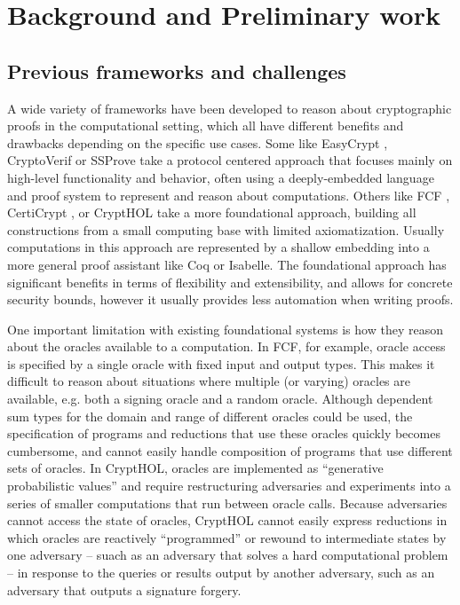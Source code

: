\section{Background and Preliminary work}

\subsection{Previous frameworks and challenges}
A wide variety of frameworks have been developed to reason about cryptographic proofs in the computational setting, which all have different benefits and drawbacks depending on the specific use cases.
Some like EasyCrypt \cite{canetti2019easyuc}, CryptoVerif \cite{blanchet2007cryptoverif} or SSProve \cite{abate2021ssprove} take a protocol centered approach that focuses mainly on high-level functionality and behavior, often using a deeply-embedded language and proof system to represent and reason about computations.
Others like FCF \cite{FCF,petcher2015foundational}, CertiCrypt \cite{zanella2010formal}, or CryptHOL \cite{basin2020crypthol} take a more foundational approach, building all constructions from a small computing base with limited axiomatization.
Usually computations in this approach are represented by a shallow embedding into a more general proof assistant like Coq or Isabelle.
The foundational approach has significant benefits in terms of flexibility and extensibility, and allows for concrete security bounds,
however it usually provides less automation when writing proofs.

One important limitation with existing foundational systems is how they reason about the oracles available to a computation.
In FCF, for example, oracle access is specified by a single oracle with fixed input and output types. This makes it difficult to reason about situations where multiple (or varying) oracles are available, e.g. both a signing oracle and a random oracle.  Although dependent sum types for the domain and range of different oracles could be used, the specification of programs and reductions that use these oracles quickly becomes cumbersome, and cannot easily handle composition of programs that use different sets of oracles.
In CryptHOL, oracles are implemented as ``generative probabilistic values'' and require restructuring adversaries and experiments into a series of smaller computations that run between oracle calls.  Because adversaries cannot access the state of oracles, CryptHOL cannot easily express reductions in which oracles are reactively ``programmed'' or rewound to intermediate states by one adversary -- suach as an adversary that solves a hard computational problem -- in response to the queries or results output by another adversary, such as an adversary that outputs a signature forgery. 


